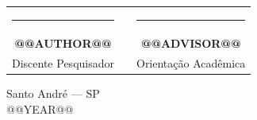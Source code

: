 \vfill

\begin{center}
\small
\begin{tabular}{cp{1.5cm}c}
\rule{6.5cm}{0.4pt} & & \rule{6.5cm}{0.4pt}\\
\textbf{@@AUTHOR@@} & & \textbf{@@ADVISOR@@}\\
Discente Pesquisador & & Orientação Acadêmica
\end{tabular}
\end{center}

\vspace{0.8cm}

\begin{center}
\footnotesize
Santo André --- SP\\
@@YEAR@@
\end{center}

\newpage
